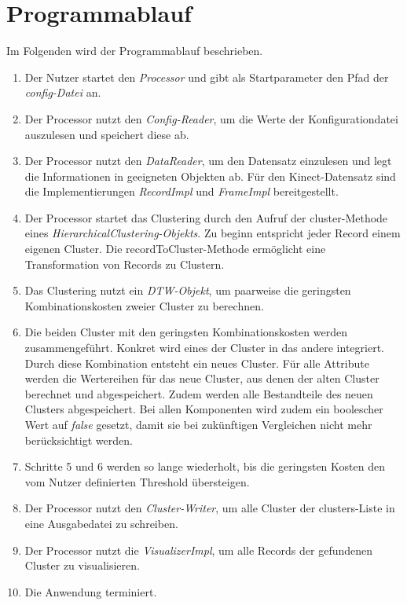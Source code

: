 \section{Programmablauf}
\label{4-Programmablauf}
Im Folgenden wird der Programmablauf beschrieben.
\begin{enumerate}
    \item Der Nutzer startet den \emph{Processor}
    und gibt als Startparameter den Pfad der \emph{config-Datei} an.
    \item Der Processor nutzt den \emph{Config-Reader}, um die Werte der Konfigurationdatei auszulesen
    und speichert diese ab.
    \item Der Processor nutzt den \emph{DataReader}, um den Datensatz einzulesen
    und legt die Informationen in geeigneten Objekten ab.
    Für den Kinect-Datensatz sind die Implementierungen \emph{RecordImpl} und \emph{FrameImpl}
    bereitgestellt.
    \item Der Processor startet das Clustering durch den Aufruf der cluster-Methode
    eines \emph{HierarchicalClustering-Objekts}.
    Zu beginn entspricht jeder Record einem eigenen Cluster.
    Die recordToCluster-Methode ermöglicht eine Transformation von Records zu Clustern.
    \item Das Clustering nutzt ein \emph{\ac{DTW}-Objekt},
    um paarweise die geringsten Kombinationskosten zweier Cluster zu berechnen.
    \item Die beiden Cluster mit den geringsten Kombinationskosten werden zusammengeführt.
    Konkret wird eines der Cluster in das andere integriert.
    Durch diese Kombination entsteht ein neues Cluster.
    Für alle Attribute werden die Wertereihen für das neue Cluster, aus denen der alten Cluster berechnet und abgespeichert.
    Zudem werden alle Bestandteile des neuen Clusters abgespeichert.
    Bei allen Komponenten wird zudem ein boolescher Wert auf \emph{false} gesetzt,
    damit sie bei zukünftigen Vergleichen nicht mehr berücksichtigt werden.
    \item Schritte 5 und 6 werden so lange wiederholt, bis die geringsten Kosten den vom Nutzer definierten Threshold übersteigen.
    \item Der Processor nutzt den \emph{Cluster-Writer}, um alle Cluster der clusters-Liste
    in eine Ausgabedatei zu schreiben.
    \item Der Processor nutzt die \emph{VisualizerImpl}, um alle Records der gefundenen Cluster zu visualisieren.
    \item Die Anwendung terminiert. 
\end{enumerate}
